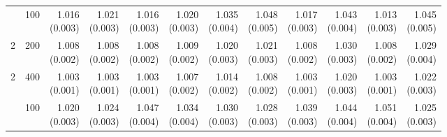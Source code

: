 \begin{table}[p]
{\begin{tabular}{llrrrrrrrrrr}
\addlinespace
2 & 100 & \shortstack{1.016\\(0.003)} & \shortstack{1.021\\(0.003)} & \shortstack{1.016\\(0.003)} & \shortstack{1.020\\(0.003)} & \shortstack{1.035\\(0.004)} & \shortstack{1.048\\(0.005)} & \shortstack{1.017\\(0.003)} & \shortstack{1.043\\(0.004)} & \shortstack{1.013\\(0.003)} & \shortstack{1.045\\(0.005)} \\
2 & 200 & \shortstack{1.008\\(0.002)} & \shortstack{1.008\\(0.002)} & \shortstack{1.008\\(0.002)} & \shortstack{1.009\\(0.002)} & \shortstack{1.020\\(0.003)} & \shortstack{1.021\\(0.003)} & \shortstack{1.008\\(0.002)} & \shortstack{1.030\\(0.003)} & \shortstack{1.008\\(0.002)} & \shortstack{1.029\\(0.004)} \\
2 & 400 & \shortstack{1.003\\(0.001)} & \shortstack{1.003\\(0.001)} & \shortstack{1.003\\(0.001)} & \shortstack{1.007\\(0.002)} & \shortstack{1.014\\(0.002)} & \shortstack{1.008\\(0.002)} & \shortstack{1.003\\(0.001)} & \shortstack{1.020\\(0.003)} & \shortstack{1.003\\(0.001)} & \shortstack{1.022\\(0.003)} \\
\addlinespace
3 & 100 & \shortstack{1.020\\(0.003)} & \shortstack{1.024\\(0.003)} & \shortstack{1.047\\(0.004)} & \shortstack{1.034\\(0.004)} & \shortstack{1.030\\(0.003)} & \shortstack{1.028\\(0.003)} & \shortstack{1.039\\(0.003)} & \shortstack{1.044\\(0.004)} & \shortstack{1.051\\(0.004)} & \shortstack{1.025\\(0.003)} \\

\end{tabular}}
\end{table}

